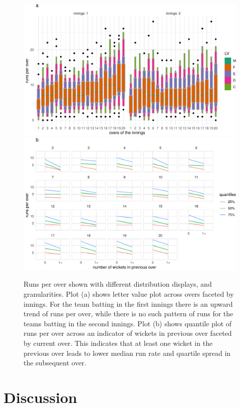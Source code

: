 \documentclass[12pt]{article}
\begin{document}
\begin{figure}

{\centering \includegraphics[width=0.9\linewidth]{figure/cricex-1} \includegraphics[width=0.9\linewidth]{figure/cricex-2} 

}

\caption{Runs per over shown with different distribution displays, and granularities. Plot (a) shows letter value plot across overs faceted by innings. For the team batting in the first innings there is an upward trend of runs per over, while there is no such pattern of runs for the teams batting in the second innings. Plot (b) shows quantile plot of runs per over across an indicator of wickets in previous over faceted by current over. This indicates that at least one wicket in the previous over leads to lower median run rate and quartile spread in the subsequent over.}\label{fig:cricex}
\end{figure}



\hypertarget{sec:discussion}{%
\section{Discussion}\label{sec:discussion}}
\end{document}

